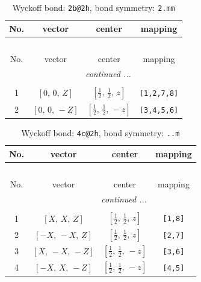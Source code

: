 \documentclass[fleqn,8pt]{jsarticle}
\begin{document}
\renewcommand{\arraystretch}{1.2}
\begin{longtable}{cccc}
\caption{Wyckoff bond: {\tt 2b@2h}, bond symmetry: {\tt 2.mm}}
 \\
 \hline \hline
No. & vector & center & mapping \\ \hline \endfirsthead

\multicolumn{3}{l}{\tablename\ \thetable{}} \\
 \hline \hline
No. & vector & center & mapping \\ \hline \endhead

 \hline \hline
\multicolumn{3}{r}{\footnotesize\it continued ...} \\ \endfoot

 \hline \hline
\multicolumn{3}{r}{} \\ \endlastfoot

1 & $\left[ 0,\, 0,\, Z \right]$ & $\left[ \frac{1}{2},\, \frac{1}{2},\, z \right]$ & {\tt [1,2,7,8]} \\ \hline
2 & $\left[ 0,\, 0,\, - Z \right]$ & $\left[ \frac{1}{2},\, \frac{1}{2},\, - z \right]$ & {\tt [3,4,5,6]} \\
\end{longtable}
\renewcommand{\arraystretch}{1.2}
\begin{longtable}{cccc}
\caption{Wyckoff bond: {\tt 4c@2h}, bond symmetry: {\tt ..m}}
 \\
 \hline \hline
No. & vector & center & mapping \\ \hline \endfirsthead

\multicolumn{3}{l}{\tablename\ \thetable{}} \\
 \hline \hline
No. & vector & center & mapping \\ \hline \endhead

 \hline \hline
\multicolumn{3}{r}{\footnotesize\it continued ...} \\ \endfoot

 \hline \hline
\multicolumn{3}{r}{} \\ \endlastfoot

1 & $\left[ X,\, X,\, Z \right]$ & $\left[ \frac{1}{2},\, \frac{1}{2},\, z \right]$ & {\tt [1,8]} \\ \hline
2 & $\left[ - X,\, - X,\, Z \right]$ & $\left[ \frac{1}{2},\, \frac{1}{2},\, z \right]$ & {\tt [2,7]} \\ \hline
3 & $\left[ X,\, - X,\, - Z \right]$ & $\left[ \frac{1}{2},\, \frac{1}{2},\, - z \right]$ & {\tt [3,6]} \\ \hline
4 & $\left[ - X,\, X,\, - Z \right]$ & $\left[ \frac{1}{2},\, \frac{1}{2},\, - z \right]$ & {\tt [4,5]} \\
\end{longtable}
\end{document}
